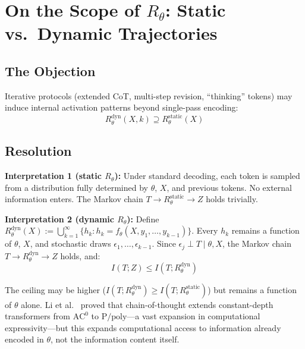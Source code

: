 \documentclass[11pt,a4paper]{article}
\theoremstyle{definition}
\newcommand{\Rtheta}{R_\theta}
\begin{document}
\section{On the Scope of $\Rtheta$: Static vs.\ Dynamic Trajectories}
\label{app:dynamic}

\subsection{The Objection}

Iterative protocols (extended CoT, multi-step revision, ``thinking'' tokens) may induce internal activation patterns beyond single-pass encoding:
\begin{equation}
R_\theta^\text{dyn}(X, k) \supseteq R_\theta^\text{static}(X)
\end{equation}

\subsection{Resolution}

\textbf{Interpretation 1 (static $\Rtheta$):} Under standard decoding, each token is sampled from a distribution fully determined by $\theta$, $X$, and previous tokens. No external information enters. The Markov chain $T \to R_\theta^\text{static} \to Z$ holds trivially.

\textbf{Interpretation 2 (dynamic $\Rtheta$):} Define $R_\theta^\text{dyn}(X) := \bigcup_{k=1}^{\infty} \{h_k : h_k = f_\theta(X, y_1, \ldots, y_{k-1})\}$. Every $h_k$ remains a function of $\theta$, $X$, and stochastic draws $\epsilon_1, \ldots, \epsilon_{k-1}$. Since $\epsilon_j \perp T \mid \theta, X$, the Markov chain $T \to R_\theta^\text{dyn} \to Z$ holds, and:
\begin{equation}
I(T; Z) \leq I(T; R_\theta^\text{dyn})
\end{equation}

The ceiling may be higher ($I(T; R_\theta^\text{dyn}) \geq I(T; R_\theta^\text{static})$) but remains a function of $\theta$ alone. Li et al.~\cite{li2024cot} proved that chain-of-thought extends constant-depth transformers from $\text{AC}^0$ to $\text{P/poly}$---a vast expansion in computational expressivity---but this expands computational access to information already encoded in $\theta$, not the information content itself.
\end{document}
